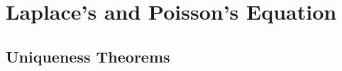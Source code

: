 \documentclass[a4paper,12pt]{report}
\begin{document}
	
	
	
	
	
	
	
	
	
	
	
	
	
	
	
	
	
	
	
	
	
	
	
	
	
	
	
	
	
	
	
	
	
	
	
	
	
	
	
	
	
	
	
	
	
	
	
	
	
	
	
	
	
	
	
	
	
	
	
	
	
	
	
	
	
	
	
	
	
	
	
	
	
	
	
	
	
	
	
	
	
	
	
	
	
	
	
	
	
	
	
	
	
	
	
	
	
	
	
	
	
	
	
	
	
	
	\chapter{Laplace's and Poisson's Equation}
	\section{Uniqueness Theorems}
	
\end{document}
